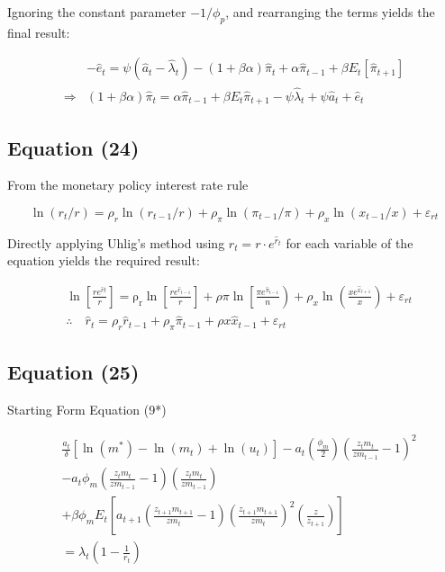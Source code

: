 \documentclass[11pt,preprint, authoryear]{elsarticle}
\numberwithin{equation}{section}
\numberwithin{figure}{section}
\numberwithin{table}{section}
\begin{document}
Ignoring the constant parameter \(-1/\phi_p\), and rearranging the terms
yields the final result:

\[\begin{aligned} &-\hat{e}_t =  \psi \left(\hat{a}_{t}-\hat{\lambda}_{t}\right) -(1+\beta \alpha)\hat{\pi}_{t} +\alpha \hat{\pi}_{t-1} + \beta E_{t}\left[ \hat{\pi}_{t+1}\right]\\
\Rightarrow &(1+\beta \alpha) \hat{\pi}_{t}=\alpha \hat{\pi}_{t-1}+\beta E_{t} \hat{\pi}_{t+1}-\psi \hat{\lambda}_{t}+\psi \hat{a}_{t}+\hat{e}_{t}
\end{aligned}\]

\hypertarget{equation-24}{%
\subsection{Equation (24)}\label{equation-24}}

From the monetary policy interest rate rule

\[\ln \left(r_{t} / r\right)=\rho_{r} \ln \left(r_{t-1} / r\right)+\rho_{\pi} \ln \left(\pi_{t-1} / \pi\right)+\rho_{x} \ln \left(x_{t-1} / x\right)+\varepsilon_{r t}\]

Directly applying Uhlig's method using \(r_t=r\cdot e^{\hat{r}_t}\) for
each variable of the equation yields the required result:

\[\begin{aligned} & \ln \left[\frac{r e^{\hat{r} t}}{r}\right]=\operatorname{\rho_r} \ln \left[\frac{r e^{\hat{r}_{t-1}}}{r}\right]+\rho{\pi} \ln \left[\frac{\pi e^{\hat{\pi}_{t-1}}}{n}\right)+\rho_x \ln \left(\frac{x e^{\hat{x}_{t+1}}}{x}\right)+\varepsilon_{rt} \\
& \therefore \quad \hat{r}_{t}=\rho_{r} \hat{r}_{t-1}+\rho_{\pi} \hat{\pi}_{t-1}+\rho x \hat{x}_{t-1}+\varepsilon_{r t} \end{aligned}\]

\hypertarget{equation-25}{%
\subsection{Equation (25)}\label{equation-25}}

Starting Form Equation (9*)

\[ \begin{aligned}
&\frac{a_{t}}{\delta}\left[\ln \left(m^{*}\right)-\ln \left(m_{t}\right)+\ln \left(u_{t}\right)\right]-a_{t}\left(\frac{\phi_{m}}{2}\right)\left(\frac{z_{t} m_{t}}{z m_{t-1}}-1\right)^{2} \\
&-a_{t} \phi_{m}\left(\frac{z_{t} m_{t}}{z m_{t-1}}-1\right)\left(\frac{z_{t} m_{t}}{z m_{t-1}}\right) \\
&+\beta \phi_{m} E_{t}\left[a_{t+1}\left(\frac{z_{t+1} m_{t+1}}{z m_{t}}-1\right)\left(\frac{z_{t+1} m_{t+1}}{z m_{t}}\right)^{2}\left(\frac{z}{z_{t+1}}\right)\right] \\
&=\lambda_{t}\left(1-\frac{1}{r_{t}}\right) \\
\end{aligned}\]
\end{document}
